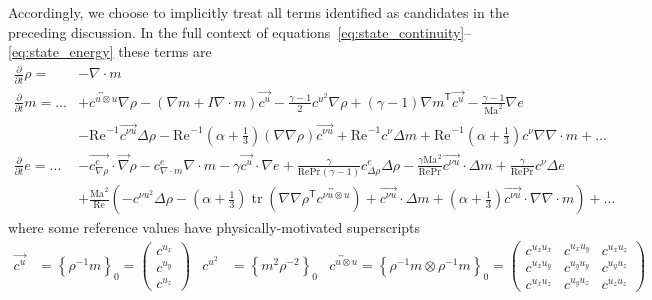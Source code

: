 \documentclass[letterpaper,11pt,nointlimits,reqno,draft]{amsart}
\newcommand{\trans}[1]{{#1}^{\ensuremath{\mathsf{T}}}}
\newcommand{\Mach}[1][]{\ensuremath{\mbox{Ma}_{#1}}}
\newcommand{\Reynolds}[1][]{\ensuremath{\mbox{Re}_{#1}}}
\newcommand{\Prandtl}[1][]{\ensuremath{\mbox{Pr}_{#1}}}
\newcommand{\reference}[1]{\ensuremath{\left\{#1\right\}_{0}}}
\DeclareMathOperator{\trace}{tr}
\begin{document}
Accordingly, we choose to implicitly treat all terms identified as candidates
in the preceding discussion.  In the full context of
equations~\eqref{eq:state_continuity}--\eqref{eq:state_energy} these terms are
\begin{align}
  \frac{\partial}{\partial{}t} \rho{} = &-\nabla\cdot{}m
\\
  \frac{\partial}{\partial{}t} m = \dots
   &+ \overleftrightarrow{c^{u\otimes{}u}} \nabla\rho
    - \left(\nabla{}m+I\nabla\cdot{}m\right)\overrightarrow{c^u}
    - \frac{\gamma-1}{2} c^{u^2} \nabla\rho
    + \left(\gamma-1\right)\trans{\nabla{}m} \overrightarrow{c^u}
    - \frac{\gamma-1}{\Mach^2}\nabla{}e
\\
   &- \Reynolds^{-1} \overrightarrow{c^{\nu{}u}} \Delta\rho
    - \Reynolds^{-1} \left(\alpha+\frac{1}{3}\right) \left(\nabla\nabla\rho\right) \overrightarrow{c^{\nu{}u}}
    + \Reynolds^{-1} c^{\nu} \Delta{}m
    + \Reynolds^{-1} \left(\alpha+\frac{1}{3}\right)c^{\nu} \nabla\nabla\cdot{}m
    + \dots
\\
  \frac{\partial}{\partial{}t} e = \dots
   &- \overrightarrow{c^{e}_{\nabla\rho}} \cdot\vec{\nabla}\rho
    - c^{e}_{\nabla\cdot{}m} \nabla\cdot{}m
    - \gamma \overrightarrow{c^u}\cdot\nabla{}e
    + \frac{\gamma}{\Reynolds\Prandtl\left(\gamma-1\right)}
      c^{e}_{\Delta\rho} \Delta\rho
    - \frac{\gamma\Mach^{2}}{\Reynolds\Prandtl}
      \overrightarrow{c^{\nu{}u}}\cdot\Delta{}m
    + \frac{\gamma}{\Reynolds\Prandtl}c^{\nu}\Delta{}e
\\
   &+ \frac{\Mach^2}{\Reynolds}\left(
       - c^{\nu{}u^2}\Delta\rho
       - \left(\alpha+\frac{1}{3}\right)
         \trace\left(\trans{\nabla\nabla\rho}
                     \overleftrightarrow{c^{\nu{}u\otimes{}u}}\right)
       + \overrightarrow{c^{\nu{}u}}\cdot\Delta{}m
       + \left(\alpha+\frac{1}{3}\right)
         \overrightarrow{c^{\nu{}u}}\cdot\nabla\nabla\cdot{}m
   \right)
       + \dots
\end{align}
where some reference values have physically-motivated superscripts
\begin{align}
  \overrightarrow{c^{u}} &= \reference{\rho^{-1}m}
  = \begin{pmatrix} c^{u_x} \\ c^{u_y} \\ c^{u_z} \end{pmatrix}
&
  c^{u^2} &= \reference{m^{2}\rho^{-2}}
&
   \overleftrightarrow{c^{u\otimes{}u}}
  = \reference{\rho^{-1}m\otimes\rho^{-1}m}
  = \begin{pmatrix}
   c^{u_x u_x} & c^{u_x u_y} & c^{u_x u_z} \\
   c^{u_x u_y} & c^{u_y u_y} & c^{u_y u_z} \\
   c^{u_x u_z} & c^{u_y u_z} & c^{u_z u_z}
  \end{pmatrix}
\end{align}
\end{document}
